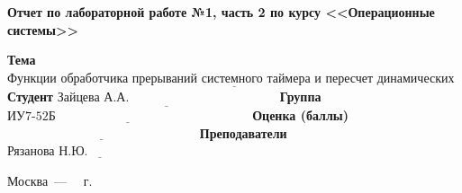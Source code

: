 \begin{titlepage}
	
	\begin{center}
		\Large\textbf{Отчет по лабораторной работе №1, часть 2 по курсу <<Операционные системы>>}
	\end{center}
	
	\noindent\textbf{Тема} $\underline{\text{Функции обработчика 
			прерываний системного таймера и
			пересчет динамических приоритетов~~~~~~}}$\newline\newline\newline
	\noindent\textbf{Студент} $\underline{\text{Зайцева А.А.~~~~~~~~~~~~~~~~~~~~~~~~~~~~~~~~~~~}}$\newline\newline
	\noindent\textbf{Группа} $\underline{\text{ИУ7-52Б~~~~~~~~~~~~~~~~~~~~~~~~~~~~~~~~~~~~~~~~~~~~~~}}$\newline\newline
	\noindent\textbf{Оценка (баллы)} $\underline{\text{~~~~~~~~~~~~~~~~~~~~~~~~~~~~~~~~~~~~~~~~~~~~~}}$\newline\newline
	\noindent\textbf{Преподаватели} $\underline{\text{Рязанова Н.Ю.~~~~~~~~~~~~~~~~~~~~~~~~~}}$\newline
	
	\begin{center}
		\vfill
		Москва~---~\the\year
		~г.
	\end{center}
 \restoregeometry
\end{titlepage}
